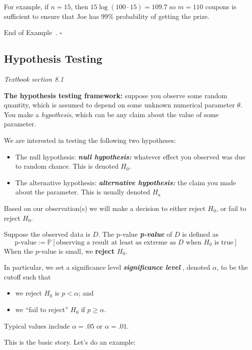 \documentclass[10pt]{article}
\theoremstyle{definition}
\newtheorem{example}[theorem]{Example}
\renewenvironment{example}
{\begin{oldexample}}
  {\par\smallskip\hfill   End of Example~\theexample. $\square$    \par\end{oldexample}}
\newcommand{\fl}{\noindent\textbf} %
\newcommand{\1}[1]{\textbf{1}_{\left[#1\right]}} %
\def\P{\mathbb{P}} %
\DeclareRobustCommand{\demph}[1]{%
  \ifmmode
  {\color{Blue}#1}%
  \else
  {\color{Blue}\bfseries\slshape #1}%
  \fi
}
\begin{document}
\begin{example}
  For example, if $n=15$, then $15\log(100\cdot15)=109.7$ so $m=110$ coupons is
  sufficient to ensure that Joe has 99\% probability of getting the prize.
\end{example}


\subsection{Hypothesis Testing}
\textit{Textbook section 8.1}

\fl{The hypothesis testing framework:} suppose you observe some random
quantity, which is assumed to depend on some unknown numerical parameter
$\theta$. You make a \textit{hypothesis}, which can be any claim about the
value of some parameter.

We are interested in testing the following two hypotheses:
\begin{itemize}
  \item The \demph{null hypothesis:} whatever effect you observed was
  due to random chance. This is denoted $H_{0}$.
  \item The \demph{alternative hypothesis:} the claim you made about the
  parameter. This is usually denoted $H_{a}$ 
\end{itemize}

Based on our observation(s) we will make a decision to either reject $H_{0}$,
or fail to reject $H_{0}$. 

Suppose the observed data is $D$. The \demph{p-value} of $D$ is defined as
\begin{equation*}
  \text{p-value} := \P\left[\text{observing a result at least as extreme as }D
    \text{ when }H_{0} \text{ is true} \right]
\end{equation*}
When the $p$-value is small, we \textbf{reject $H_{0}$}.

In particular, we set a \demph{significance level}, denoted $\alpha$, to be the
cutoff such that
\begin{itemize}
  \item we reject $H_{0}$ is $p<\alpha$; and
  \item we ``fail to reject'' $H_{0}$ if $p \geq \alpha$.
\end{itemize}
Typical values include $\alpha=.05$ or $\alpha=.01$. 



This is the basic story. Let's do an example:
\end{document}
